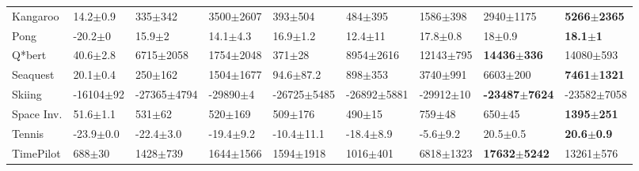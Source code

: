 \documentclass[accepted]{article}
\theoremstyle{plain}
\theoremstyle{definition}
\theoremstyle{remark}
\begin{document}
\begin{table}[H]
{\begin{tabular}{@{}lllllllll@{}}
\multicolumn{1}{l|}{Kangaroo}   & \multicolumn{1}{l|}{14.2\tiny$\pm$0.9}  & 335\tiny$\pm$342          & 3500\tiny$\pm$2607       & \multicolumn{1}{l|}{393\tiny$\pm$504}     & \multicolumn{1}{l|}{484\tiny$\pm$395}     & 1586\tiny$\pm$398        & 2940\tiny$\pm$1175             & \textbf{5266\tiny$\pm$2365}     \\
\multicolumn{1}{l|}{Pong}       & \multicolumn{1}{l|}{-20.2\tiny$\pm$0}   & 15.9\tiny$\pm$2           & 14.1\tiny$\pm$4.3        & \multicolumn{1}{l|}{16.9\tiny$\pm$1.2}    & \multicolumn{1}{l|}{12.4\tiny$\pm$11}     & 17.8\tiny$\pm$0.8        & 18\tiny$\pm$0.9                & \textbf{18.1\tiny$\pm$1}        \\
\multicolumn{1}{l|}{Q*bert}     & \multicolumn{1}{l|}{40.6\tiny$\pm$2.8}  & 6715\tiny$\pm$2058        & 1754\tiny$\pm$2048       & \multicolumn{1}{l|}{371\tiny$\pm$28}      & \multicolumn{1}{l|}{8954\tiny$\pm$2616}   & 12143\tiny$\pm$795       & \textbf{14436\tiny$\pm$336}    & 14080\tiny$\pm$593              \\
\multicolumn{1}{l|}{Seaquest}   & \multicolumn{1}{l|}{20.1\tiny$\pm$0.4}  & 250\tiny$\pm$162          & 1504\tiny$\pm$1677       & \multicolumn{1}{l|}{94.6\tiny$\pm$87.2}   & \multicolumn{1}{l|}{898\tiny$\pm$353}     & 3740\tiny$\pm$991        & 6603\tiny$\pm$200              & \textbf{7461\tiny$\pm$1321}     \\
\multicolumn{1}{l|}{Skiing}     & \multicolumn{1}{l|}{-16104\tiny$\pm$92} & -27365\tiny$\pm$4794      & -29890\tiny$\pm$4        & \multicolumn{1}{l|}{-26725\tiny$\pm$5485} & \multicolumn{1}{l|}{-26892\tiny$\pm$5881} & -29912\tiny$\pm$10       & \textbf{-23487\tiny$\pm$7624}  & -23582\tiny$\pm$7058            \\
\multicolumn{1}{l|}{Space Inv.} & \multicolumn{1}{l|}{51.6\tiny$\pm$1.1}  & 531\tiny$\pm$62           & 520\tiny$\pm$169         & \multicolumn{1}{l|}{509\tiny$\pm$176}     & \multicolumn{1}{l|}{490\tiny$\pm$15}      & 759\tiny$\pm$48          & 650\tiny$\pm$45                & \textbf{1395\tiny$\pm$251}      \\
\multicolumn{1}{l|}{Tennis}     & \multicolumn{1}{l|}{-23.9\tiny$\pm$0.0} & -22.4\tiny$\pm$3.0        & -19.4\tiny$\pm$9.2       & \multicolumn{1}{l|}{-10.4\tiny$\pm$11.1}  & \multicolumn{1}{l|}{-18.4\tiny$\pm$8.9}   & -5.6\tiny$\pm$9.2        & 20.5\tiny$\pm$0.5              & \textbf{20.6\tiny$\pm$0.9}      \\
\multicolumn{1}{l|}{TimePilot}  & \multicolumn{1}{l|}{688\tiny$\pm$30}    & 1428\tiny$\pm$739         & 1644\tiny$\pm$1566       & \multicolumn{1}{l|}{1594\tiny$\pm$1918}   & \multicolumn{1}{l|}{1016\tiny$\pm$401}    & 6818\tiny$\pm$1323       & \textbf{17632\tiny$\pm$5242}   & 13261\tiny$\pm$576              \\

\end{tabular}}
\end{table}
\end{document}
